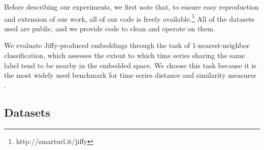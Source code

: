 


Before describing our experiments, we first note that, to ensure easy reproduction and extension of our work, all of our code is freely available.\footnote{http://smarturl.it/jiffy} All of the datasets used are public, and we provide code to clean and operate on them.

We evaluate Jiffy-produced embeddings through the task of 1-nearest-neighbor classification, which assesses the extent to which time series sharing the same label tend to be nearby in the embedded space. We choose this task because it is the most widely used benchmark for time series distance and similarity measures \citep{tsBakeoff2008,bakeoff2016}. %


\subsection{Datasets}

